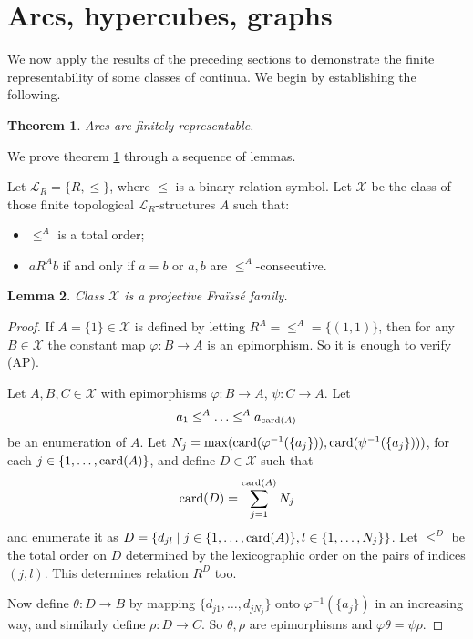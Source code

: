 \documentclass[12pt,twoside,a4paper]{amsart}
\theoremstyle{plain}
\newtheorem{theorem}{Theorem}
\newtheorem{lemma}[theorem]{Lemma}
\theoremstyle{definition}
\begin{document}
\section{Arcs, hypercubes, graphs} \label{graphs}
We now apply the results of the preceding sections to demonstrate the finite representability of some classes of continua.
We begin by establishing the following.

\begin{theorem} \label{repnarcs}
Arcs are finitely representable.
\end{theorem}

We prove theorem \ref{repnarcs} through a sequence of lemmas.

Let $ \mathcal L_R=\{ R,\leq\} $, where $\leq $ is a binary relation symbol.
Let $ \mathcal X $ be the class of those finite topological $ \mathcal L_R$-structures $A$ such that:
\begin{itemize}
\item $\leq^A$ is a total order;
\item $aR^Ab$ if and only if $a=b$ or $a,b$ are $\leq^A$-consecutive.
\end{itemize}

\begin{lemma}
Class $ \mathcal X $ is a projective Fra\"iss\'e family.
\end{lemma}

\begin{proof}
If $A=\{ 1\}\in \mathcal X $ is defined by letting $R^A= {\leq^A} =\{ (1,1)\} $, then for any $B\in \mathcal X $ the constant map $ {\varphi} :B\to A$ is an epimorphism.
So it is enough to verify (AP).

Let $A,B,C\in \mathcal X $ with epimorphisms $ {\varphi} :B\to A$, $\psi :C\to A$.
Let 
\[
a_1\leq^A\ldots\leq^Aa_{ {{\rm{card}}} (A)}
\]
be an enumeration of $A$.
Let $N_j=\max ( {{\rm{card}}} ( {\varphi}^{-1}(\{ a_j\} )), {{\rm{card}}} (\psi^{-1}(\{ a_j\} )))$, for each $j\in\{ 1,\ldots , {{\rm{card}}} (A)\} $, and define $D\in \mathcal X $ such that
\[
{{\rm{card}}} (D)=\sum_{j=1}^{ {{\rm{card}}} (A)}N_j
\]
and enumerate it as $D=\{ d_{jl}\mid j\in\{ 1,\ldots , {{\rm{card}}} (A)\} ,l\in\{ 1,\ldots ,N_j\}\}$.
Let $\leq^D$ be the total order on $D$ determined by the lexicographic order on the pairs of indices $(j,l)$.
This determines relation $R^D$ too.

Now define $\theta :D\to B$ by mapping $\{ d_{j1},\ldots ,d_{jN_j}\} $ onto $ {\varphi}^{-1}(\{ a_j\} )$ in an increasing way, and similarly define $\rho :D\to C$.
So $\theta ,\rho $ are epimorphisms and $ {\varphi} \theta =\psi\rho $.
\end{proof}
\end{document}

